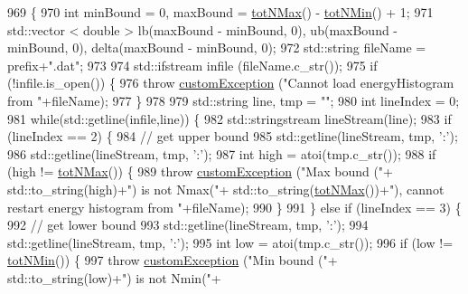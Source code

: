 \begin{DoxyCode}
969                                                               \{
970     \textcolor{keywordtype}{int} minBound = 0, maxBound = \hyperlink{classsim_system_aee2c65ecb43a35c0c4d070cdb45f7dc0}{totNMax}() - \hyperlink{classsim_system_af10842e0eaa638373b8717c87b47e6bc}{totNMin}() + 1;
971     std::vector < double > lb(maxBound - minBound, 0), ub(maxBound - minBound, 0), delta(maxBound - 
      minBound, 0);
972     std::string fileName = prefix+\textcolor{stringliteral}{".dat"};
973 
974     std::ifstream infile (fileName.c\_str());
975     \textcolor{keywordflow}{if} (!infile.is\_open()) \{
976         \textcolor{keywordflow}{throw} \hyperlink{classcustom_exception}{customException} (\textcolor{stringliteral}{"Cannot load energyHistogram from "}+fileName);
977     \}
978 
979     std::string line, tmp = \textcolor{stringliteral}{""};
980     \textcolor{keywordtype}{int} lineIndex = 0;
981     \textcolor{keywordflow}{while}(std::getline(infile,line)) \{
982         std::stringstream lineStream(line);
983         \textcolor{keywordflow}{if} (lineIndex == 2) \{
984             \textcolor{comment}{// get upper bound}
985             std::getline(lineStream, tmp, \textcolor{charliteral}{':'});
986             std::getline(lineStream, tmp, \textcolor{charliteral}{':'});
987             \textcolor{keywordtype}{int} high = atoi(tmp.c\_str());
988             \textcolor{keywordflow}{if} (high != \hyperlink{classsim_system_aee2c65ecb43a35c0c4d070cdb45f7dc0}{totNMax}()) \{
989                 \textcolor{keywordflow}{throw} \hyperlink{classcustom_exception}{customException} (\textcolor{stringliteral}{"Max bound ("}+ std::to\_string(high)+\textcolor{stringliteral}{") is not Nmax("}+
      std::to\_string(\hyperlink{classsim_system_aee2c65ecb43a35c0c4d070cdb45f7dc0}{totNMax}())+\textcolor{stringliteral}{"), cannot restart energy histogram from "}+fileName);
990             \}
991         \} \textcolor{keywordflow}{else} \textcolor{keywordflow}{if} (lineIndex == 3) \{
992             \textcolor{comment}{// get lower bound}
993             std::getline(lineStream, tmp, \textcolor{charliteral}{':'});
994             std::getline(lineStream, tmp, \textcolor{charliteral}{':'});
995             \textcolor{keywordtype}{int} low = atoi(tmp.c\_str());
996             \textcolor{keywordflow}{if} (low != \hyperlink{classsim_system_af10842e0eaa638373b8717c87b47e6bc}{totNMin}()) \{
997                 \textcolor{keywordflow}{throw} \hyperlink{classcustom_exception}{customException} (\textcolor{stringliteral}{"Min bound ("}+ std::to\_string(low)+\textcolor{stringliteral}{") is not Nmin("}+

\end{DoxyCode}

